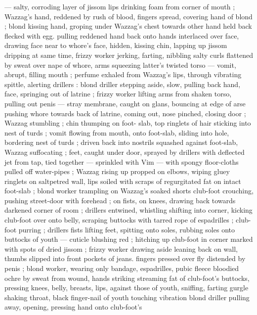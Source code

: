 --- salty, corroding layer of jissom {\dashcom} lips drinking foam from corner 
of mouth ; Wazzag's hand, reddened by rush of blood, fingers 
spread, covering hand of blond ; blond kissing hand, groping under 
Wazzag's chest towards other hand held back flecked with egg. 
pulling reddened hand back onto hands interlaced over face, drawing 
face near to whore's face, hidden, kissing chin, lapping up jissom 
dripping {\col} at same time, frizzy worker jerking, farting, nibbling salty 
curls flattened by sweat over nape of whore, arms squeezing latter's 
twisted torso --- vomit, abrupt, filling mouth ; perfume exhaled from 
Wazzag's lips, through vibrating spittle, alerting drillers : blond 
driller stepping aside, slow, pulling back hand, face, springing out of 
latrine ; frizzy worker lifting arms from shaken torso, pulling out 
penis --- stray membrane, caught on glans, bouncing at edge of arse 
{\dashcom} pushing whore towards back of latrine, coming out, nose 
pinched, closing door ; Wazzag stumbling ; chin thumping on foot- 
slab, top ringlets of hair sticking into nest of turds ; vomit flowing 
from mouth, onto foot-slab, sliding into hole, bordering nest of turds 
; driven back into nostrils squashed against foot-slab, Wazzag 
suffocating ; feet, caught under door, sprayed by drillers with 
deflected jet from tap, tied together --- sprinkled with Vim --- with 
spongy floor-cloths pulled off water-pipes ; Wazzag rising up 
propped on elbows, wiping {\col} gluey ringlets on saltpetred wall, lips 
soiled with scraps of regurgitated fat on intact foot-slab ; blond 
worker trampling on Wazzag's soaked shorts {\semislash} club-foot crouching, 
pushing street-door with forehead ; on fists, on knees, drawing back 
towards darkened corner of room ; drillers entwined, whistling 
shifting into corner, kicking club-foot over onto belly, scraping 
buttocks with tarred rope of espadrilles ; club-foot purring ; drillers 
fists lifting feet, spitting onto soles, rubbing soles onto buttocks of 
youth --- cuticle blushing red ; hitching up club-foot in corner 
marked with spots of dried jissom ; frizzy worker drawing aside 
leaning back on wall, thumbs slipped into front pockets of jeans. 
fingers pressed over fly distended by penis ; blond worker, wearing 
only bandage, espadrilles, pubic fleece bloodied ochre by sweat from 
wound, hands striking streaming fat of club-foot's buttocks, pressing 
knees, belly, breasts, lips, against those of youth, sniffing, farting 
gurgle shaking throat, black finger-nail of youth touching vibration 
blond driller pulling away, opening, pressing hand onto club-foot's 
